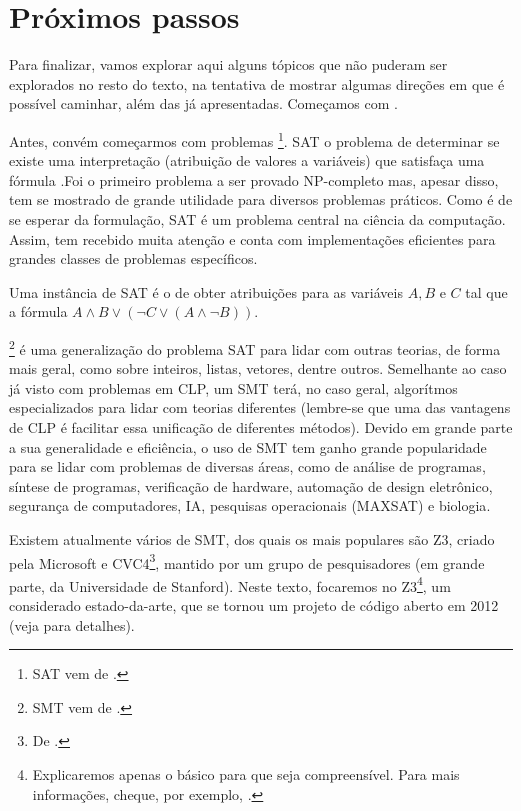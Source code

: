 
%

%

\section{Próximos passos}

Para finalizar, vamos explorar aqui alguns tópicos que não puderam ser
explorados no resto do texto, na tentativa de mostrar algumas direções
em que é possível caminhar, além das já apresentadas. Começamos com
.

Antes, convém começarmos com problemas  \footnote{SAT
  vem de .}. SAT o problema de
determinar se existe uma interpretação (atribuição de
valores  a variáveis) que
satisfaça uma fórmula .Foi o primeiro
problema a ser provado NP-completo mas, apesar disso, tem se mostrado
de grande utilidade para diversos problemas práticos. Como é de se
esperar da formulação, SAT é um problema central na ciência da
computação. Assim, tem recebido muita atenção e conta com
implementações eficientes para grandes classes de problemas
específicos.

Uma instância de SAT é o de obter atribuições para as variáveis $A, B$
e $C$ tal que a fórmula $A \wedge B \vee (\neg C \vee (A \wedge \neg B))$.

\footnote{SMT vem de
  .} é uma generalização do
problema SAT para lidar com outras teorias, de forma mais geral, como
sobre inteiros, listas, vetores, dentre outros. Semelhante ao caso já
visto com problemas em CLP, um  SMT terá, no caso
geral, algorítmos especializados para lidar com teorias diferentes
(lembre-se que uma das vantagens de CLP é facilitar essa unificação de
diferentes métodos). Devido em grande parte a sua generalidade e
eficiência, o uso de  SMT tem ganho grande
popularidade para se lidar com problemas de diversas áreas, como de
análise de programas\cite{zheng}, síntese de programas\cite{beyene},
verificação de hardware\cite{kroenig}, automação de design
eletrônico\cite{kroenig}, segurança de computadores\cite{vanegue}, IA,
pesquisas operacionais (MAXSAT)\cite{li} e biologia\cite{yordanov}.

Existem atualmente vários  de SMT, dos quais os mais
populares são Z3, criado pela Microsoft e CVC4\footnote{De
  .}, mantido por um grupo de
pesquisadores (em grande parte, da Universidade de Stanford). Neste
texto, focaremos no Z3\footnote{Explicaremos apenas o básico para que
  seja compreensível. Para mais informações, cheque, por exemplo,
  \cite{z3}.}, um  considerado
estado-da-arte, que se tornou um projeto de código aberto em 2012
(veja \cite{leo} para detalhes).

